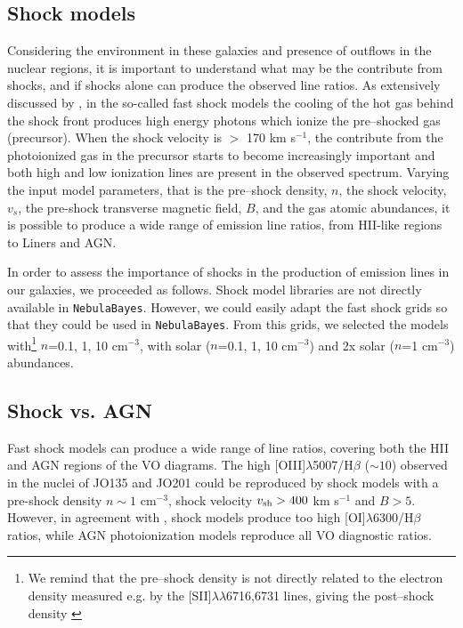 \documentclass[fleqn,usenatbib]{mnras}
\begin{document}
\subsection{Shock models}

Considering the environment in these galaxies and presence of outflows in the nuclear regions, it is important to understand what may be the contribute from shocks, and if shocks alone can produce the observed line ratios. 
As extensively discussed by \citet{2008ApJS..178...20A},  in the so-called fast shock models the cooling of the hot gas behind the shock front produces high energy photons which ionize the pre--shocked gas (precursor). When the shock velocity is $>$ 170 km s$^{-1}$, the contribute from the photoionized gas in the precursor starts to become increasingly important and both high and low ionization lines are present in the observed spectrum. Varying  the input model parameters, that is the pre--shock density, $n$, the shock velocity, $v_s$, the pre-shock transverse magnetic field, $B$, and the gas atomic abundances, it is possible to produce a wide range of emission line ratios, from HII-like regions to Liners and AGN. 

In order to assess the importance of shocks in the production of emission lines in our galaxies, we proceeded as follows.
Shock model libraries are not directly available in \texttt{NebulaBayes}. However, we could easily adapt the  \citet{2008ApJS..178...20A} fast shock grids so that they could be used in \texttt{NebulaBayes}. From this grids, we selected the models with\footnote{We remind that the pre--shock density is not directly related to the electron density measured e.g. by the [SII]$\lambda\lambda$6716,6731 lines, giving the post--shock density \citep[see e.g.][]{1995ApJ...455..468D}}  $n$=0.1, 1, 10 cm$^{-3}$, with solar ($n$=0.1, 1, 10 cm$^{-3}$) and 2x solar ($n$=1 cm$^{-3}$) abundances. 

\subsection{Shock vs. AGN}
\label{sec:shock2agn}

Fast shock models can produce a wide range of line ratios, covering both the HII and AGN regions of the VO diagrams. The high [OIII]$\lambda$5007/H$\beta$ ($\sim 10$) observed in the nuclei of JO135 and JO201 could be reproduced by shock models with a pre-shock density $n \sim 1$ cm$^{-3}$, shock velocity $v_{\rm sh} > 400$ km s$^{-1}$ and $B > 5$. However, in agreement with \citet{2008ApJS..178...20A}, shock models produce too high [OI]$\lambda$6300/H$\beta$ ratios, while AGN photoionization models reproduce all VO diagnostic ratios.
\end{document}
